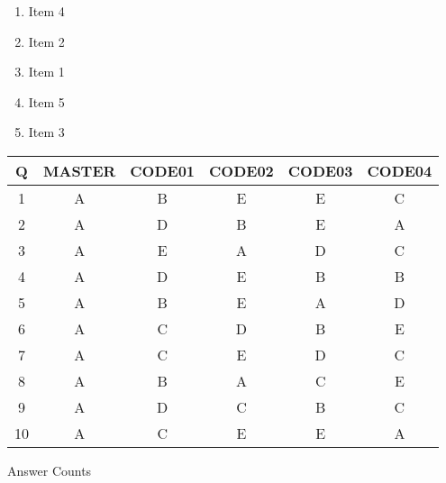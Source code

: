 \documentclass[amsfonts,bezier,leqno,fleqn,12pt,a4paper]{article}
\begin{document}
{{{{\begin{large}
\begin{enumerate}
\begin{enumerate}
\item  Item 4
\item  Item 2
\item  Item 1
\item  Item 5
\item  Item 3

\end{enumerate}
\newpage


\end{enumerate}
\end{large}






\newpage

\renewcommand{\thepage}{\noindent MATH101, Term 212, Final Exam \hfill {\bf \fbox{Answer KEY}}}
\begin{normalsize}
\setcounter{page}{1}
\vspace {1cm}

\begin{center}

  \begin{tabular}{|c||c|c|c|c|c| 
}
  \hline
  Q&MASTER&CODE01&CODE02&CODE03&CODE04 \\ \hline 
  1&A&B&E&E&C\\ \hline2&A&D&B&E&A\\ \hline3&A&E&A&D&C\\ \hline4&A&D&E&B&B\\ \hline5&A&B&E&A&D\\ \hline6&A&C&D&B&E\\ \hline7&A&C&E&D&C\\ \hline8&A&B&A&C&E\\ \hline9&A&D&C&B&C\\ \hline10&A&C&E&E&A
  \\ \hline 
  \end{tabular}
    
\end{center}
\end{normalsize}



\newpage


\renewcommand{\thepage}{\noindent MATH101, Term 212, Final Exam \hfill {\bf \fbox{Answer Counts}}}
\begin{normalsize}
\begin{center}
\vspace {1cm}

\begin{Large}
Answer Counts \\
\end{Large}
\vspace {1cm}


\end{center}
\end{normalsize}}}}}
\end{document}
